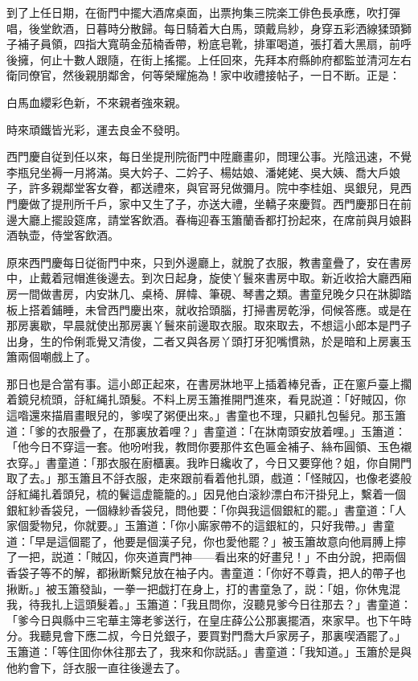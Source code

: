 到了上任日期，在衙門中擺大酒席桌面，出票拘集三院楽工俳色長承應，吹打彈唱，後堂飲酒，日暮時分散歸。每日騎着大白馬，頭戴烏紗，身穿五彩洒線猱頭獅子補子員領，四指大寬萌金茄楠香帶，粉底皂靴，排軍喝道，張打着大黑扇，前呼後擁，何止十數人跟隨，在街上搖擺。上任回來，先拜本府縣帥府都監並清河左右衛同僚官，然後親朋鄰舍，何等榮耀施為！家中收禮接帖子，一日不断。正是：

\begin{myquote}
白馬血纓彩色新，不來親者強來親。

時來頑鐵皆光彩，運去良金不發明。
\end{myquote}

西門慶自従到任以來，每日坐提刑院衙門中陞廳畫卯，問理公事。光陰迅速，不覺李瓶兒坐褥一月將滿。吳大妗子、二妗子、楊姑娘、潘姥姥、吳大姨、喬大戶娘子，許多親鄰堂客女眷，都送禮來，與官哥兒做彌月。院中李桂姐、吳銀兒，見西門慶做了提刑所千戶，家中又生了子，亦送大禮，坐轎子來慶賀。西門慶那日在前邊大廳上擺設筵席，請堂客飲酒。春梅迎春玉簫蘭香都打扮起來，在席前與月娘斟酒執壶，侍堂客飲酒。

原來西門慶每日従衙門中來，只到外邊廳上，就脫了衣服，教書童疊了，安在書房中，止戴着冠帽進後邊去。到次日起身，旋使丫鬟來書房中取。新近收拾大廳西廂房一間做書房，内安牀几、桌椅、屏幃、筆硯、琴書之類。書童兒晚夕只在牀脚踏板上搭着鋪睡，未曾西門慶出來，就收拾頭腦，打掃書房乾淨，伺候答應。或是在那房裏歇，早晨就使出那房裏丫鬟來前邊取衣服。取來取去，不想這小郎本是門子出身，生的伶俐乖覺又清俊，二者又與各房丫頭打牙犯嘴慣熟，於是暗和上房裏玉簫兩個嘲戲上了。

那日也是合當有事。這小郎正起來，在書房牀地平上插着棒兒香，正在窻戶臺上擱着鏡兒梳頭，㧱紅䋲扎頭髮。不料上房玉簫推開門進來，看見説道：「好賊囚，你這喒還來描眉畫眼兒的，爹喫了粥便出來。」書童也不理，只顧扎包髻兒。那玉簫道：「爹的衣服疊了，在那裏放着哩？」書童道：「在牀南頭安放着哩。」玉簫道：「他今日不穿這一套。他吩咐我，教問你要那件玄色匾金補子、絲布圓領、玉色襯衣穿。」書童道：「那衣服在廚櫃裏。我昨日纔收了，今日又要穿他？姐，你自開門取了去。」那玉簫且不㧱衣服，走來跟前看着他扎頭，戲道：「怪賊囚，也像老婆般㧱紅䋲扎着頭兒，梳的鬢這虚籠籠的。」因見他白滚紗漂白布汗掛兒上，繫着一個銀紅紗香袋兒，一個綠紗香袋兒，問他要：「你與我這個銀紅的罷。」書童道：「人家個愛物兒，你就要。」玉簫道：「你小廝家帶不的這銀紅的，只好我帶。」書童道：「早是這個罷了，他要是個漢子兒，你也愛他罷？」被玉簫故意向他肩膊上擰了一把，説道：「賊囚，你夾道賣門神——看出來的好畫兒！」不由分說，把兩個香袋子等不的解，都揪断繫兒放在袖子内。書童道：「你好不尊貴，把人的帶子也揪断。」被玉簫發訕，一拳一把戯打在身上，打的書童急了，説：「姐，你休鬼混我，待我扎上這頭髮着。」玉簫道：「我且問你，沒聽見爹今日往那去？」書童道：「爹今日與縣中三宅華主簿老爹送行，在皇庄薛公公那裏擺酒，來家早。也下午時分。我聽見會下應二叔，今日兑銀子，要買對門喬大戶家房子，那裏喫酒罷了。」玉簫道：「等住囬你休往那去了，我來和你説話。」書童道：「我知道。」玉簫於是與他約會下，㧱衣服一直往後邊去了。

